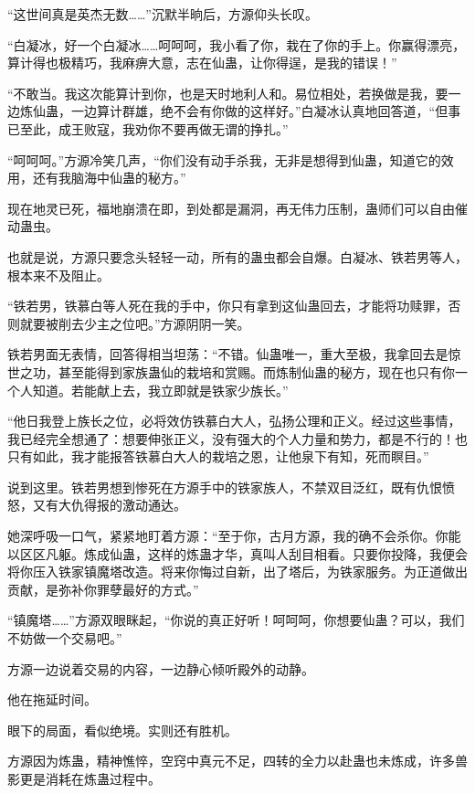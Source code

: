 
\begin{this_body}

“这世间真是英杰无数……”沉默半晌后，方源仰头长叹。

“白凝冰，好一个白凝冰……呵呵呵，我小看了你，栽在了你的手上。你赢得漂亮，算计得也极精巧，我麻痹大意，志在仙蛊，让你得逞，是我的错误！”

“不敢当。我这次能算计到你，也是天时地利人和。易位相处，若换做是我，要一边炼仙蛊，一边算计群雄，绝不会有你做的这样好。”白凝冰认真地回答道，“但事已至此，成王败寇，我劝你不要再做无谓的挣扎。”

“呵呵呵。”方源冷笑几声，“你们没有动手杀我，无非是想得到仙蛊，知道它的效用，还有我脑海中仙蛊的秘方。”

现在地灵已死，福地崩溃在即，到处都是漏洞，再无伟力压制，蛊师们可以自由催动蛊虫。

也就是说，方源只要念头轻轻一动，所有的蛊虫都会自爆。白凝冰、铁若男等人，根本来不及阻止。

“铁若男，铁慕白等人死在我的手中，你只有拿到这仙蛊回去，才能将功赎罪，否则就要被削去少主之位吧。”方源阴阴一笑。

铁若男面无表情，回答得相当坦荡：“不错。仙蛊唯一，重大至极，我拿回去是惊世之功，甚至能得到家族蛊仙的栽培和赏赐。而炼制仙蛊的秘方，现在也只有你一个人知道。若能献上去，我立即就是铁家少族长。”

“他日我登上族长之位，必将效仿铁慕白大人，弘扬公理和正义。经过这些事情，我已经完全想通了：想要伸张正义，没有强大的个人力量和势力，都是不行的！也只有如此，我才能报答铁慕白大人的栽培之恩，让他泉下有知，死而瞑目。”

说到这里。铁若男想到惨死在方源手中的铁家族人，不禁双目泛红，既有仇恨愤怒，又有大仇得报的激动通达。

她深呼吸一口气，紧紧地盯着方源：“至于你，古月方源，我的确不会杀你。你能以区区凡躯。炼成仙蛊，这样的炼蛊才华，真叫人刮目相看。只要你投降，我便会将你压入铁家镇魔塔改造。将来你悔过自新，出了塔后，为铁家服务。为正道做出贡献，是弥补你罪孽最好的方式。”

“镇魔塔……”方源双眼眯起，“你说的真正好听！呵呵呵，你想要仙蛊？可以，我们不妨做一个交易吧。”

方源一边说着交易的内容，一边静心倾听殿外的动静。

他在拖延时间。

眼下的局面，看似绝境。实则还有胜机。

方源因为炼蛊，精神憔悴，空窍中真元不足，四转的全力以赴蛊也未炼成，许多兽影更是消耗在炼蛊过程中。


\end{this_body}
